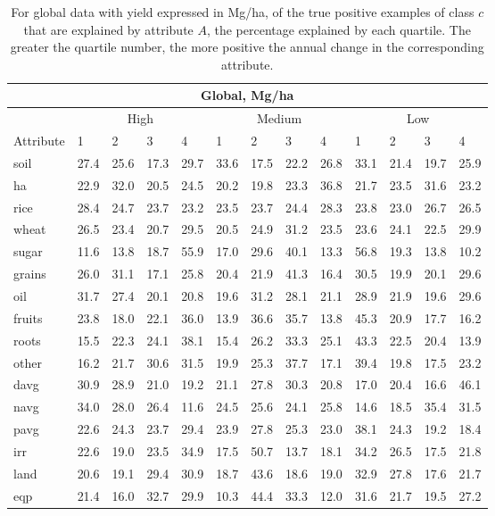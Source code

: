 \documentclass[12pt,twoside]{article}
\begin{document}
\begin{table}
\centering
\begin{tabular}{lllllllllllll}
\toprule
\multicolumn{13}{c}{\textbf{Global, Mg/ha}} \\
\midrule
& \multicolumn{4}{c}{High} & \multicolumn{4}{c}{Medium} & \multicolumn{4}{c}{Low} \\
\cmidrule(lr){2-5}
\cmidrule(lr){6-9}
\cmidrule(l){10-13}
Attribute & 1 & 2 & 3 & 4 & 1 & 2 & 3 & 4 & 1 & 2 & 3 & 4 \\
\midrule
soil & 27.4 & 25.6 & 17.3 & 29.7 & 33.6 & 17.5 & 22.2 & 26.8 & 33.1 & 21.4 & 19.7 & 25.9 \\
ha & 22.9 & 32.0 & 20.5 & 24.5 & 20.2 & 19.8 & 23.3 & 36.8 & 21.7 & 23.5 & 31.6 & 23.2 \\
rice & 28.4 & 24.7 & 23.7 & 23.2 & 23.5 & 23.7 & 24.4 & 28.3 & 23.8 & 23.0 & 26.7 & 26.5 \\
wheat & 26.5 & 23.4 & 20.7 & 29.5 & 20.5 & 24.9 & 31.2 & 23.5 & 23.6 & 24.1 & 22.5 & 29.9 \\
sugar & 11.6 & 13.8 & 18.7 & 55.9 & 17.0 & 29.6 & 40.1 & 13.3 & 56.8 & 19.3 & 13.8 & 10.2 \\
grains & 26.0 & 31.1 & 17.1 & 25.8 & 20.4 & 21.9 & 41.3 & 16.4 & 30.5 & 19.9 & 20.1 & 29.6 \\
oil & 31.7 & 27.4 & 20.1 & 20.8 & 19.6 & 31.2 & 28.1 & 21.1 & 28.9 & 21.9 & 19.6 & 29.6 \\
fruits & 23.8 & 18.0 & 22.1 & 36.0 & 13.9 & 36.6 & 35.7 & 13.8 & 45.3 & 20.9 & 17.7 & 16.2 \\
roots & 15.5 & 22.3 & 24.1 & 38.1 & 15.4 & 26.2 & 33.3 & 25.1 & 43.3 & 22.5 & 20.4 & 13.9 \\
other & 16.2 & 21.7 & 30.6 & 31.5 & 19.9 & 25.3 & 37.7 & 17.1 & 39.4 & 19.8 & 17.5 & 23.2 \\
davg & 30.9 & 28.9 & 21.0 & 19.2 & 21.1 & 27.8 & 30.3 & 20.8 & 17.0 & 20.4 & 16.6 & 46.1 \\
navg & 34.0 & 28.0 & 26.4 & 11.6 & 24.5 & 25.6 & 24.1 & 25.8 & 14.6 & 18.5 & 35.4 & 31.5 \\
pavg & 22.6 & 24.3 & 23.7 & 29.4 & 23.9 & 27.8 & 25.3 & 23.0 & 38.1 & 24.3 & 19.2 & 18.4 \\
irr & 22.6 & 19.0 & 23.5 & 34.9 & 17.5 & 50.7 & 13.7 & 18.1 & 34.2 & 26.5 & 17.5 & 21.8 \\
land & 20.6 & 19.1 & 29.4 & 30.9 & 18.7 & 43.6 & 18.6 & 19.0 & 32.9 & 27.8 & 17.6 & 21.7 \\
eqp & 21.4 & 16.0 & 32.7 & 29.9 & 10.3 & 44.4 & 33.3 & 12.0 & 31.6 & 21.7 & 19.5 & 27.2 \\
\bottomrule
\end{tabular}
\captionsetup{width=.7\textwidth}
\caption[Percentage of Examples Explained by Quartile (Global, Mg/ha)]{For global data with yield expressed in Mg/ha, of the true positive examples of class $c$ that are explained by attribute $A$, the percentage explained by each quartile. The greater the quartile number, the more positive the annual change in the corresponding attribute.}
\label{t.ny.wt.quartiles}
\end{table}

\clearpage


\end{document}
